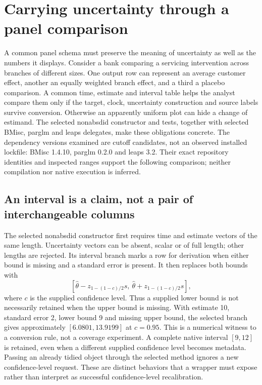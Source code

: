 \section{Carrying uncertainty through a panel comparison}
\label{sec:exec29-panel-inference-contracts}

A common panel schema must preserve the meaning of uncertainty as well as the numbers it displays. Consider a bank comparing a servicing intervention across branches of different sizes. One output row can represent an average customer effect, another an equally weighted branch effect, and a third a placebo comparison. A common time, estimate and interval table helps the analyst compare them only if the target, clock, uncertainty construction and source labels survive conversion. Otherwise an apparently uniform plot can hide a change of estimand. The selected nonabsdid constructor and tests, together with selected BMisc, parglm and leaps delegates, make these obligations concrete. The dependency versions examined are cutoff candidates, not an observed installed lockfile: BMisc 1.4.10, parglm 0.2.0 and leaps 3.2. Their exact repository identities and inspected ranges support the following comparison; neither compilation nor native execution is inferred.\citep{exec29_panel_inference_sources}

\subsection{An interval is a claim, not a pair of interchangeable columns}

The selected nonabsdid constructor first requires time and estimate vectors of the same length. Uncertainty vectors can be absent, scalar or of full length; other lengths are rejected. Its interval branch marks a row for derivation when either bound is missing and a standard error is present. It then replaces both bounds with
\[
 [\widehat\theta-z_{1-(1-c)/2}s,\ \widehat\theta+z_{1-(1-c)/2}s],
\]
where $c$ is the supplied confidence level. Thus a supplied lower bound is not necessarily retained when the upper bound is missing. With estimate 10, standard error 2, lower bound 9 and missing upper bound, the selected branch gives approximately $[6.0801,13.9199]$ at $c=0.95$. This is a numerical witness to a conversion rule, not a coverage experiment. A complete native interval $[9,12]$ is retained, even when a different supplied confidence level becomes metadata. Passing an already tidied object through the selected method ignores a new confidence-level request. These are distinct behaviors that a wrapper must expose rather than interpret as successful confidence-level recalibration.\citep{exec29_panel_inference_sources,exec29_panel_inference_reference}

